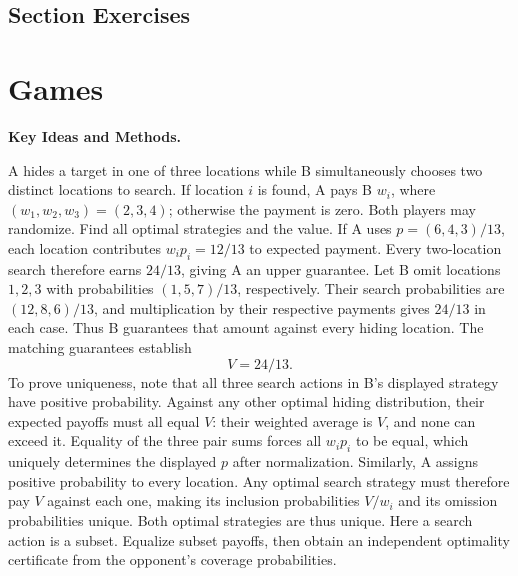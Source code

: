 \par{}
\subsection*{Section Exercises}




\section{Games}
\noindent\textbf{Key Ideas and Methods.}\enspace





A hides a target in one of three locations while B simultaneously chooses two distinct locations to search. If location $i$ is found, A pays B $w_i$, where $(w_1,w_2,w_3)=(2,3,4)$; otherwise the payment is zero. Both players may randomize. Find all optimal strategies and the value.
\solution If A uses $p=(6,4,3)/13$, each location contributes $w_ip_i=12/13$ to expected payment. Every two-location search therefore earns $24/13$, giving A an upper guarantee.
Let B omit locations $1,2,3$ with probabilities $(1,5,7)/13$, respectively. Their search probabilities are $(12,8,6)/13$, and multiplication by their respective payments gives $24/13$ in each case. Thus B guarantees that amount against every hiding location. The matching guarantees establish
\[
 \boxed{V=24/13}.
\]
To prove uniqueness, note that all three search actions in B's displayed strategy have positive probability. Against any other optimal hiding distribution, their expected payoffs must all equal $V$: their weighted average is $V$, and none can exceed it. Equality of the three pair sums forces all $w_ip_i$ to be equal, which uniquely determines the displayed $p$ after normalization.
Similarly, A assigns positive probability to every location. Any optimal search strategy must therefore pay $V$ against each one, making its inclusion probabilities $V/w_i$ and its omission probabilities unique. Both optimal strategies are thus unique.
\insight Here a search action is a subset. Equalize subset payoffs, then obtain an independent optimality certificate from the opponent's coverage probabilities.


